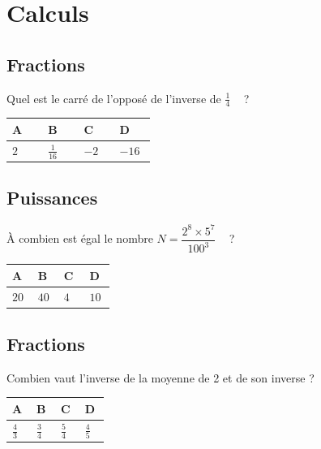 \documentclass[oneside,12pt]{article}
\let\oldsection\section
\renewcommand{\section}{\newpage\oldsection}
\begin{document}
\section{Calculs}

\subsection{Fractions}
Quel est le carré de l'opposé de l'inverse de $\frac{1}{4}$ ~ ?

\begin{center}
	\renewcommand{\arraystretch}{1.5}
	\begin{tabular}{| P{0.22\linewidth} | P{0.22\linewidth} | P{0.22\linewidth} | P{0.22\linewidth} |} \hline
	A & B & C & D \\ \hline
	$2$ & $\frac{1}{16}$ & $-2$ & $-16$ \\ \hline
	\end{tabular}
\end{center}



\subsection{Puissances}
À combien est égal le nombre $N=\dfrac{2^8\times5^7}{100^3}$ ~ ?

\begin{center}
	\renewcommand{\arraystretch}{1.5}
	\begin{tabular}{| P{0.22\linewidth} | P{0.22\linewidth} | P{0.22\linewidth} | P{0.22\linewidth} |} \hline
	A & B & C & D \\ \hline
	$20$ & $40$ & $4$ & $10$ \\ \hline
	\end{tabular}
\end{center}



\subsection{Fractions}
Combien vaut l'inverse de la moyenne de 2 et de son inverse ?

\begin{center}
	\renewcommand{\arraystretch}{1.5}
	\begin{tabular}{| P{0.22\linewidth} | P{0.22\linewidth} | P{0.22\linewidth} | P{0.22\linewidth} |} \hline
	A & B & C & D \\ \hline
	$\frac{4}{3}$ & $\frac{3}{4}$ & $\frac{5}{4}$ & $\frac{4}{5}$ \\ \hline
	\end{tabular}
\end{center}
\end{document}
